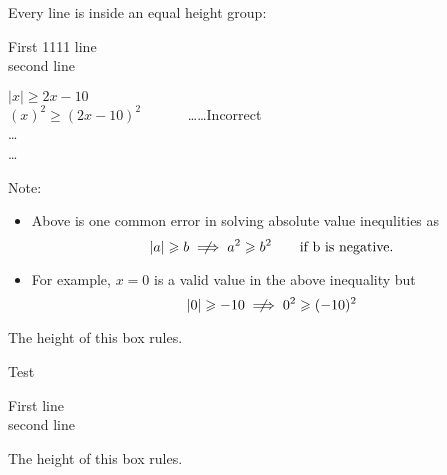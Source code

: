 \clearpage



\noindent 
Every line is inside an equal height group:
\begin{tcbraster}[raster equal height,
                  title=Box \thetcbrasternum,
                  enhanced,
                  size=small,
                  styexample]
\begin{tcolorbox}First 1111 line\\second line\\


\begin{warningEnv}
     $ \lvert x \rvert \geqslant 2x-10 $ \\
     $ (x)^2 \geqslant (2x-10)^2 \quad \quad \quad $ \dots \dots Incorrect \\
     \dots \\
     \dots     
\end{warningEnv}



Note:
\begin{itemize}
       \item[] Above is one common error in solving absolute value inequlities as 
                \[    \lvert a \rvert \geqslant b       \centernot\implies     a^2 \geqslant b^2  \quad  \quad \text{if b is negative.} \]    
    
      \item[]  For example, $x=0$ is a valid value in the above inequality but
                \[     \lvert 0 \rvert \geqslant -10       \centernot\implies     0^2 \geqslant (-10)^2 \] 
\end{itemize}





The height of this box rules.\end{tcolorbox}
\begin{tcolorbox}Test\end{tcolorbox}
\begin{tcolorbox}
First line\\second line\end{tcolorbox}
\begin{tcolorbox}The height of this box rules.\end{tcolorbox}
\end{tcbraster}






